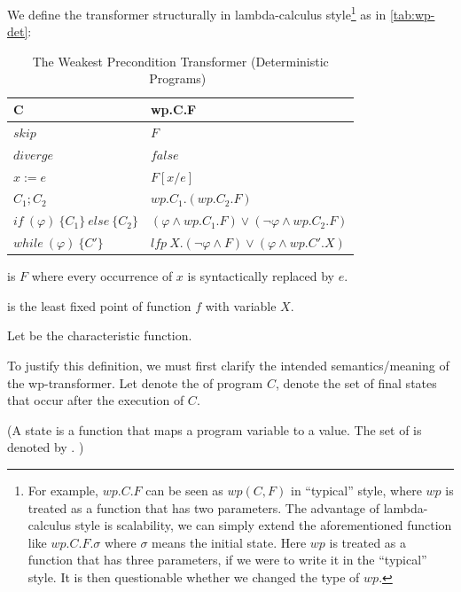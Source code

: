 We define the  transformer structurally in lambda-calculus style\footnote{For example, $wp.C.F$ can be seen as $wp(C,F)$ in ``typical'' style, where $wp$ is treated as a function that has two parameters. The advantage of lambda-calculus style is scalability, we can simply extend the aforementioned function like $wp.C.F.\sigma$ where $\sigma$ means the initial state. Here $wp$ is treated as a function that has three parameters, if we were to write it in the ``typical'' style. It is then questionable whether we changed the type of $wp$. } as in \autoref{tab:wp-det}: 

\begin{table}[h!]\centering
    \begin{tabular}{ll}
    \hline\hline
      \textbf{C}&\textbf{wp.C.F}    \\ \hline
      $skip$&   $F$   \\
      $diverge$&  $false$\\
      $x:= e $&  $F[x/e]$\\
      $C_1;C_2$&  $wp.C_1.(wp.C_2.F)$\\
      $if\ (\varphi)\ \{C_1\}\ else\ \{C_2\} $&  $(\varphi\wedge wp.C_1.F)\vee(\neg\varphi\wedge wp.C_2.F)$\\
      $while\ (\varphi)\ \{C'\}$&  $lfp\ X.(\neg\varphi\wedge F)\vee(\varphi\wedge wp.C'.X)$\\
    \hline\hline
    \end{tabular}
    \caption{The Weakest Precondition Transformer (Deterministic Programs)~\cite{kaminski19}}
    \label{tab:wp-det}
\end{table}

 is $F$ where every occurrence of $x$ is syntactically replaced by $e$. 

 is the least fixed point of function $f$ with variable $X$. 

Let  be the characteristic function. 

To justify this definition, we must first clarify the intended semantics/meaning of the wp-transformer. 
Let  denote the  of program $C$,  denote the set of final states that  occur after the execution of $C$. 

(A state is a function that maps a program variable to a value. The set of  is denoted by . )

